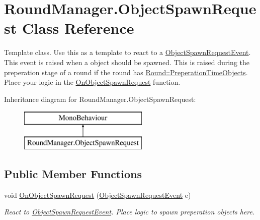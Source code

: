 \hypertarget{class_round_manager_1_1_object_spawn_request}{}\section{Round\+Manager.\+Object\+Spawn\+Request Class Reference}
\label{class_round_manager_1_1_object_spawn_request}


Template class. Use this as a template to react to a \hyperlink{class_round_manager_1_1_events_1_1_object_spawn_request_event}{Object\+Spawn\+Request\+Event}. This event is raised when a object should be spawned. This is raised during the preperation stage of a round if the round has \hyperlink{class_round_manager_1_1_round_a1e58477543ce08f5fd2a436ebadbcc7c}{Round\+::\+Preperation\+Time\+Objects}. Place your logic in the \hyperlink{class_round_manager_1_1_object_spawn_request_a79308b31355872f486b2c9157eea12b6}{On\+Object\+Spawn\+Request} function.  


Inheritance diagram for Round\+Manager.\+Object\+Spawn\+Request\+:\begin{figure}[H]
\begin{center}
\leavevmode
\includegraphics[height=2.000000cm]{class_round_manager_1_1_object_spawn_request}
\end{center}
\end{figure}
\subsection*{Public Member Functions}
\begin{DoxyCompactItemize}
\item 
void \hyperlink{class_round_manager_1_1_object_spawn_request_a79308b31355872f486b2c9157eea12b6}{On\+Object\+Spawn\+Request} (\hyperlink{class_round_manager_1_1_events_1_1_object_spawn_request_event}{Object\+Spawn\+Request\+Event} e)
\begin{DoxyCompactList}\small\item\em React to \hyperlink{class_round_manager_1_1_events_1_1_object_spawn_request_event}{Object\+Spawn\+Request\+Event}. Place logic to spawn preperation objects here. \end{DoxyCompactList}\end{DoxyCompactItemize}


